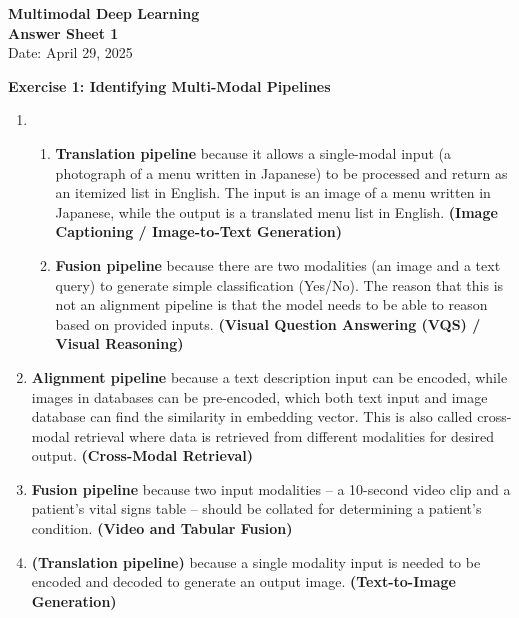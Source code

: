 \documentclass[11pt]{article}
\begin{document}
\begin{center}
    {\Large \textbf{Multimodal Deep Learning}} \\ [0.3em]
    {\large \textbf{Answer Sheet 1}} \\ [0.3em]
    \large Date: April 29, 2025
\end{center}

\vspace{1cm}

\noindent
\textbf{Exercise 1: Identifying Multi-Modal Pipelines}

\begin{enumerate}[label=(\alph*)]
    \item  {
    \begin{enumerate}[label=\arabic*.]
        \item \textbf{Translation pipeline} because it allows a single-modal input (a photograph of a menu written in Japanese) to be processed and return as an itemized list in English. 
        The input is an image of a menu written in Japanese, while the output is a translated menu list in English.
        \textbf{(Image Captioning / Image-to-Text Generation)}
        \item \textbf{Fusion pipeline} because there are two modalities (an image and a text query) to generate simple classification (Yes/No).
        The reason that this is not an alignment pipeline is that the model needs to be able to reason based on provided inputs.
        \textbf{(Visual Question Answering (VQS) / Visual Reasoning)}
    \end{enumerate}
    }

    \item \textbf{Alignment pipeline} because a text description input can be encoded, while images in databases can be pre-encoded, which both text input and image database can find the similarity in embedding vector.
    This is also called cross-modal retrieval where data is retrieved from different modalities for desired output.
    \textbf{(Cross-Modal Retrieval)}

    \item \textbf{Fusion pipeline} because two input modalities -- a 10-second video clip and a patient’s vital signs table -- should be collated for determining a patient's condition.
    \textbf{(Video and Tabular Fusion)}

    \item \textbf{(Translation pipeline)} because a single modality input is needed to be encoded and decoded to generate an output image.
    \textbf{(Text-to-Image Generation)}
\end{enumerate}
\end{document}
